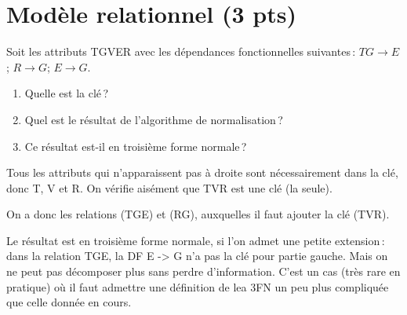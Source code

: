 \section{Modèle relationnel ({\bf 3 pts})}

Soit les attributs TGVER avec les dépendances fonctionnelles suivantes\,:
$TG \to E$; $R \to G$; $E \to G$.

\begin{enumerate}
  \item Quelle est la clé\,?
  \item Quel est le résultat de l'algorithme de normalisation\,?
  \item Ce résultat est-il en troisième forme normale\,?
\end{enumerate}


\begin{solution}
Tous les attributs qui n'apparaissent pas à droite sont nécessairement
dans la clé, donc T, V  et R. On vérifie aisément que TVR est une clé
(la seule).

On a donc les relations (TGE) et (RG), auxquelles il faut ajouter la clé
(TVR). 

Le résultat est en troisième forme normale, si l'on admet une petite extension\,:
dans la relation TGE, la DF E -> G n'a pas la clé pour partie gauche. Mais on ne peut 
pas décomposer plus sans perdre d'information. C'est un cas (très rare en pratique) où il
faut admettre une définition de lea 3FN un peu plus compliquée que celle donnée en cours.


\end{solution}


